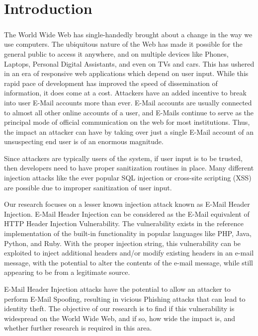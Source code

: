 \chapter{Introduction}
\paragraph{}
	The World Wide Web has single-handedly brought about a change in the way we use computers. The ubiquitous nature of the Web has made it possible for the general public to access it anywhere, and on multiple devices like Phones, Laptops, Personal Digital Assistants, and even on TVs and cars. This has ushered in an era of responsive web applications which depend on user input. While this rapid pace of development has improved the speed of dissemination of information, it does come at a cost. Attackers have an added incentive to break into user E-Mail accounts more than ever. E-Mail accounts are usually connected to almost all other online accounts of a user, and E-Mails continue to serve as the principal mode of official communication on the web for most institutions. Thus, the impact an attacker can have by taking over just a single E-Mail account of an unsuspecting end user is of an enormous magnitude. 
	
	Since attackers are typically users of the system, if user input is to be trusted, then developers need to have proper sanitization routines in place. Many different injection attacks like the ever popular SQL injection or cross-site scripting (XSS) \cite{OWASPT10} are possible due to improper sanitization of user input. 
	
	Our research focuses on a lesser known injection attack known as E-Mail Header Injection. E-Mail Header Injection can be considered as the E-Mail equivalent of HTTP Header Injection Vulnerability. The vulnerability exists in the reference implementation of the built-in  functionality in popular languages like PHP, Java, Python, and Ruby. With the proper injection string, this vulnerability can be exploited to inject additional headers and/or modify existing headers in an e-mail message, with the potential to alter the contents of the e-mail message, while still appearing to be from a legitimate source.
	
	E-Mail Header Injection attacks have the potential to allow an attacker to perform E-Mail Spoofing, resulting in vicious Phishing attacks that can lead to identity theft.
	The objective of our research is to find if this vulnerability is widespread on the World Wide Web, and if so, how wide the impact is, and whether further research is required in this area.
	
